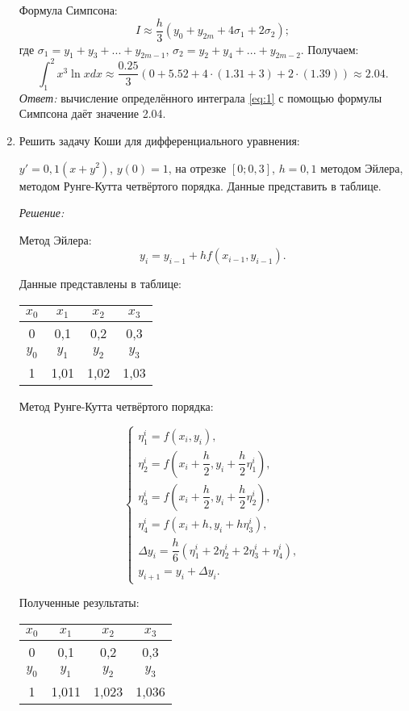 \documentclass[a4paper, 12pt]{article}
\begin{document}
\begin{enumerate}
{    Формула Симпсона:
    $$I \approx \dfrac {h} {3} \left ( y_0 + y_{2m} + 4 \sigma_1 + 2 \sigma_2 \right );$$
    где $\sigma_1 = y_1 + y_3 + ... + y_{2m-1}$, $\sigma_2 = y_2 + y_4 + ... + y_{2m-2}$.
    Получаем:
    $$\int_1^2x^3 \ln{x} dx \approx \dfrac {0.25} {3} \left ( 0 + 5.52 + 4 \cdot (1.31 + 3) + 2 \cdot (1.39) \right ) \approx 2.04.$$
    \emph{Ответ:} вычисление определённого интеграла \eqref{eq:1} с помощью формулы Симпсона даёт значение 2.04.
  }
\item{Решить задачу Коши для дифференциального уравнения:

    $y' = 0,1(x + y^2)$, $y(0) = 1$, на отрезке $[0; 0,3]$, $h=0,1$ методом Эйлера, методом Рунге-Кутта четвёртого порядка. Данные представить в таблице.

    \emph{Решение:}

    Метод Эйлера:
    $$y_i = y_{i-1} + h f(x_{i-1}, y_{i-1}).$$

    Данные представлены в таблице:

    \begin{center}
      \begin{tabular}{|c|c|c|c|}
        \hline
        $x_0$ & $x_1$ & $x_2$ & $x_3$ \\ \hline
        0 & 0,1 & 0,2 & 0,3 \\ \hline
        $y_0$ & $y_1$ & $y_2$ & $y_3$ \\ \hline
        1 & 1,01 & 1,02 & 1,03 \\ \hline
      \end{tabular}
    \end{center}

    Метод Рунге-Кутта четвёртого порядка:

    $$
    \begin{cases}
      \eta_1^i = f(x_i, y_i), \\
      \eta_2^i = f \left ( x_i + \dfrac {h} {2}, y_i + \dfrac {h} {2} \eta_1^i \right ), \\
      \eta_3^i = f \left ( x_i + \dfrac {h} {2}, y_i + \dfrac {h} {2} \eta_2^i \right ), \\
      \eta_4^i = f \left ( x_i + h, y_i + h \eta_3^i \right ), \\
      \Delta y_i = \dfrac {h} {6} \left ( \eta_1^i + 2 \eta_2^i + 2 \eta_3^i + \eta_4^i \right ), \\
      y_{i+1} = y_i + \Delta y_i.
    \end{cases}
    $$

    Полученные результаты:
    \begin{center}
      \begin{tabular}{|c|c|c|c|}
        \hline
        $x_0$ & $x_1$ & $x_2$ & $x_3$ \\ \hline
        0 & 0,1 & 0,2 & 0,3 \\ \hline
        $y_0$ & $y_1$ & $y_2$ & $y_3$ \\ \hline
        1 & 1,011 & 1,023 & 1,036 \\ \hline
      \end{tabular}
    \end{center}

  }
\end{enumerate}
\end{document}

